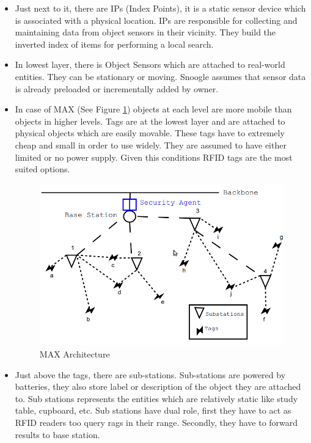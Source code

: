\documentclass [a4paper,12pt]{book}
\begin{document}
\begin{itemize}
\begin{itemize}
\item Just next to it, there are IPs (Index Points), it is a static sensor device which is associated with a physical location. IPs are responsible for collecting and maintaining data from object sensors in their vicinity. They build the inverted index of items for performing a local search.
\item In lowest layer, there is Object Sensors which are attached to real-world entities. They can be stationary or moving. Snoogle assumes that sensor data is already preloaded or incrementally added by owner.

\item In case of MAX (See Figure \ref{max}) objects at each level are more mobile than objects in higher levels. Tags are at the lowest layer and are attached to physical objects which are easily movable. These tags have to extremely cheap and small in order to use widely. They are assumed to have either limited or no power supply. Given this conditions RFID tags are the most suited options.

\vspace{0.5cm}
\begin{figure}[!h]
\begin{center}
\includegraphics[scale=.4]{images/4.png}
\caption{MAX Architecture \cite{13}}
\label{max}
\end{center}
\end{figure}

\item Just above the tags, there are sub-stations. Sub-stations are powered by batteries, they also store label or description of the object they are attached to. Sub stations represents the entities which are relatively static like study table, cupboard, etc. Sub stations have dual role, first they have to act as RFID readers too query rags in their range. Secondly, they have to forward results to base station.


\end{itemize}
\end{itemize}
\end{document}
